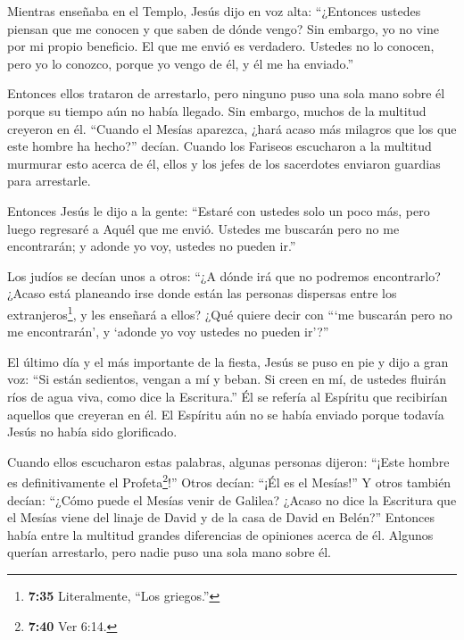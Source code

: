  Mientras enseñaba en el Templo, Jesús dijo en voz alta:
``¿Entonces ustedes piensan que me conocen y que saben de dónde vengo?
Sin embargo, yo no vine por mi propio beneficio. El que me envió es
verdadero. Ustedes no lo conocen,  pero yo lo conozco,
porque yo vengo de él, y él me ha enviado.''

 Entonces ellos trataron de arrestarlo, pero ninguno puso
una sola mano sobre él porque su tiempo aún no había llegado.
 Sin embargo, muchos de la multitud creyeron en él.
``Cuando el Mesías aparezca, ¿hará acaso más milagros que los que este
hombre ha hecho?'' decían.  Cuando los Fariseos escucharon
a la multitud murmurar esto acerca de él, ellos y los jefes de los
sacerdotes enviaron guardias para arrestarle.

 Entonces Jesús le dijo a la gente: ``Estaré con ustedes
solo un poco más, pero luego regresaré a Aquél que me envió.
 Ustedes me buscarán pero no me encontrarán; y adonde yo
voy, ustedes no pueden ir.''

 Los judíos se decían unos a otros: ``¿A dónde irá que no
podremos encontrarlo? ¿Acaso está planeando irse donde están las
personas dispersas entre los extranjeros\footnote{\textbf{7:35}
  Literalmente, ``Los griegos.''}, y les enseñará a ellos? 
¿Qué quiere decir con ```me buscarán pero no me encontrarán', y `adonde
yo voy ustedes no pueden ir'?''

 El último día y el más importante de la fiesta, Jesús se
puso en pie y dijo a gran voz: ``Si están sedientos, vengan a mí y
beban.  Si creen en mí, de ustedes fluirán ríos de agua
viva, como dice la Escritura.''  Él se refería al Espíritu
que recibirían aquellos que creyeran en él. El Espíritu aún no se había
enviado porque todavía Jesús no había sido glorificado.

 Cuando ellos escucharon estas palabras, algunas personas
dijeron: ``¡Este hombre es definitivamente el Profeta\footnote{\textbf{7:40}
  Ver 6:14.}!''  Otros decían: ``¡Él es el Mesías!'' Y
otros también decían: ``¿Cómo puede el Mesías venir de Galilea?
 ¿Acaso no dice la Escritura que el Mesías viene del linaje
de David y de la casa de David en Belén?''  Entonces había
entre la multitud grandes diferencias de opiniones acerca de él.
 Algunos querían arrestarlo, pero nadie puso una sola mano
sobre él.


